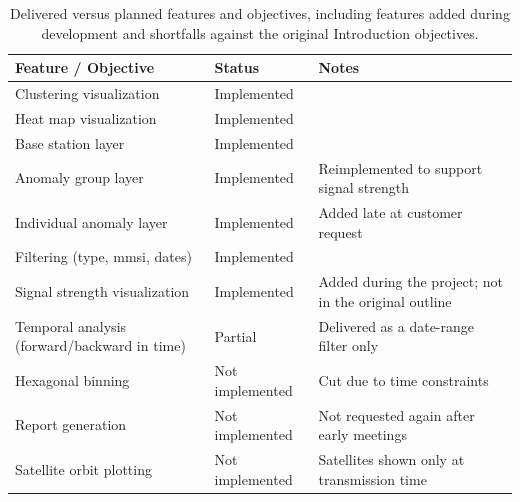 \begin{table}[H]
\centering
\begin{tabular}{ m{4.5cm} m{2.6cm} m{5.4cm} }
\toprule
\textbf{Feature / Objective} & \textbf{Status} & \textbf{Notes} \\
\midrule
Clustering visualization & Implemented & \\
Heat map visualization & Implemented & \\
Base station layer & Implemented & \\
Anomaly group layer & Implemented & Reimplemented to support signal strength \\
Individual anomaly layer & Implemented & Added late at customer request \\
Filtering (type, \acrshort{mmsi}, dates) & Implemented & \\
Signal strength visualization & Implemented & Added during the project; not in the original outline \\
Temporal analysis (forward/backward in time) & Partial & Delivered as a date-range filter only \\
Hexagonal binning & Not implemented & Cut due to time constraints \\
Report generation & Not implemented & Not requested again after early meetings \\
Satellite orbit plotting & Not implemented & Satellites shown only at transmission time \\
\bottomrule
\end{tabular}
\caption[Delivered versus planned features]{Delivered versus planned features and objectives, including features added during development and shortfalls against the original Introduction objectives.}
\label{tab:delivered_vs_planned}
\end{table}
